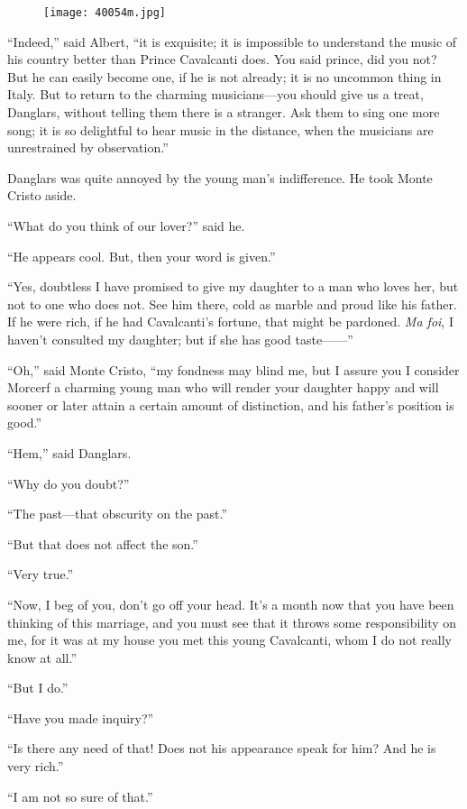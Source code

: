 \begin{figure}[ht]
\texttt{[image: 40054m.jpg]}
\end{figure}

“Indeed,” said Albert, “it is exquisite; it is impossible to understand
the music of his country better than Prince Cavalcanti does. You said
prince, did you not? But he can easily become one, if he is not
already; it is no uncommon thing in Italy. But to return to the
charming musicians—you should give us a treat, Danglars, without
telling them there is a stranger. Ask them to sing one more song; it is
so delightful to hear music in the distance, when the musicians are
unrestrained by observation.”

Danglars was quite annoyed by the young man’s indifference. He took
Monte Cristo aside.

“What do you think of our lover?” said he.

“He appears cool. But, then your word is given.”

“Yes, doubtless I have promised to give my daughter to a man who loves
her, but not to one who does not. See him there, cold as marble and
proud like his father. If he were rich, if he had Cavalcanti’s fortune,
that might be pardoned. \textit{Ma foi}, I haven’t consulted my daughter; but
if she has good taste——”

“Oh,” said Monte Cristo, “my fondness may blind me, but I assure you I
consider Morcerf a charming young man who will render your daughter
happy and will sooner or later attain a certain amount of distinction,
and his father’s position is good.”

“Hem,” said Danglars.

“Why do you doubt?”

“The past—that obscurity on the past.”

“But that does not affect the son.”

“Very true.”

“Now, I beg of you, don’t go off your head. It’s a month now that you
have been thinking of this marriage, and you must see that it throws
some responsibility on me, for it was at my house you met this young
Cavalcanti, whom I do not really know at all.”

“But I do.”

“Have you made inquiry?”

“Is there any need of that! Does not his appearance speak for him? And
he is very rich.”

“I am not so sure of that.”

